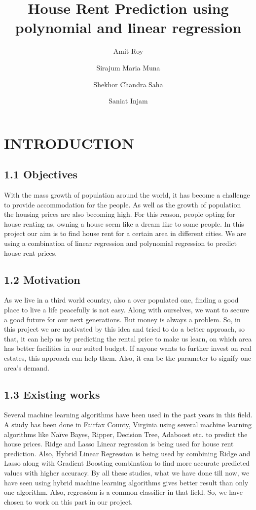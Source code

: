 \documentclass[conference]{IEEEtran}[10]
\begin{document}
\title{House Rent Prediction using polynomial and linear regression}
\author[1]{ Amit Roy
}

\author[2]{ Sirajum Maria Muna
}

\author[3]{ Shekhor Chandra Saha
}

\author[4]{ Saniat Injam
}

\maketitle
\IEEEpubidadjcol
\section{INTRODUCTION}
\subsection{1.1 Objectives}
With the mass growth of population around the world, it has become a challenge to provide accommodation for the people. As well as the growth of population the housing prices are also becoming high. For this reason, people opting for house renting as, owning a house seem like a dream like to some people. In this project our aim is to find house rent for a certain area in different cities. We are using a combination of linear regression and polynomial regression to predict house rent prices. 
\subsection{1.2 Motivation}
As we live in a third world country, also a over populated one, finding a good place to live a life peacefully is not easy. Along with ourselves, we want to secure a good future for our next generations. But money is always a problem. So, in this project we are motivated by this idea and tried to do a better approach, so that, it can help us by predicting the rental price to make us learn, on which area has better facilities in our suited budget. If anyone wants to further invest on real estates, this approach can help them. Also, it can be the parameter to signify one area’s demand.
\subsection*{1.3 Existing works}
Several machine learning algorithms have been used in the past years in this field. A study has been done in Fairfax County, Virginia using several machine learning algorithms like Naïve Bayes, Ripper, Decision Tree, Adaboost etc. to predict the house prices.\cite{park2015using}
Ridge and Lasso Linear regression is being used for house rent prediction.\cite{kumar2019house}
Also, Hybrid Linear Regression is being used by combining Ridge and Lasso along with Gradient Boosting combination to find more accurate predicted values with higher accuracy.\cite{c3}
By all these studies, what we have done till now, we have seen using hybrid machine learning algorithms gives better result than only one algorithm. Also, regression is a common classifier in that field. So, we have chosen to work on this part in our project.
\end{document}
